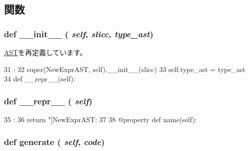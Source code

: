 \subsection{関数}
\hypertarget{classslicc_1_1ast_1_1NewExprAST_1_1NewExprAST_ac775ee34451fdfa742b318538164070e}{
\subsubsection[{\_\-\_\-init\_\-\_\-}]{\setlength{\rightskip}{0pt plus 5cm}def \_\-\_\-init\_\-\_\- ( {\em self}, \/   {\em slicc}, \/   {\em type\_\-ast})}}
\label{classslicc_1_1ast_1_1NewExprAST_1_1NewExprAST_ac775ee34451fdfa742b318538164070e}


\hyperlink{classslicc_1_1ast_1_1AST_1_1AST_ac775ee34451fdfa742b318538164070e}{AST}を再定義しています。


\begin{DoxyCode}
31                                        :
32         super(NewExprAST, self).__init__(slicc)
33         self.type_ast = type_ast
34 
    def __repr__(self):
\end{DoxyCode}
\hypertarget{classslicc_1_1ast_1_1NewExprAST_1_1NewExprAST_ad8b9328939df072e4740cd9a63189744}{
\subsubsection[{\_\-\_\-repr\_\-\_\-}]{\setlength{\rightskip}{0pt plus 5cm}def \_\-\_\-repr\_\-\_\- ( {\em self})}}
\label{classslicc_1_1ast_1_1NewExprAST_1_1NewExprAST_ad8b9328939df072e4740cd9a63189744}



\begin{DoxyCode}
35                       :
36         return "[NewExprAST: %
37 
38     @property
    def name(self):
\end{DoxyCode}
\hypertarget{classslicc_1_1ast_1_1NewExprAST_1_1NewExprAST_a4555d1cee0dccf3942ea35fe86de2e8e}{
\subsubsection[{generate}]{\setlength{\rightskip}{0pt plus 5cm}def generate ( {\em self}, \/   {\em code})}}
\label{classslicc_1_1ast_1_1NewExprAST_1_1NewExprAST_a4555d1cee0dccf3942ea35fe86de2e8e}



